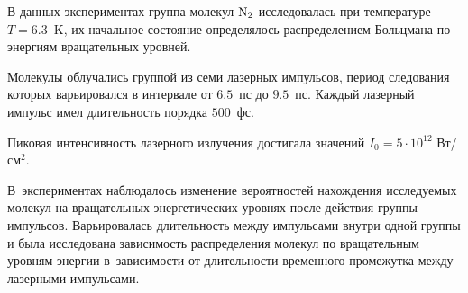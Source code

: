 В данных экспериментах группа молекул $\rm N_{2}$ исследовалась при температуре $T=6.3$~K, их начальное состояние определялось распределением Больцмана по энергиям вращательных уровней. 

Молекулы облучались группой из семи лазерных импульсов, период следования которых варьировался в интервале от $6.5$~пс до $9.5$~пс. Каждый лазерный импульс имел длительность порядка $500$~фс. 

Пиковая интенсивность лазерного излучения достигала значений $I_0=5\cdot 10^{12}$ Вт/см$^2$. 

В~экспериментах наблюдалось изменение вероятностей нахождения исследуемых молекул на вращательных энергетических уровнях после действия группы импульсов. Варьировалась длительность между импульсами внутри одной группы и была исследована зависимость распределения молекул по вращательным уровням энергии в~зависимости от длительности временного промежутка между лазерными импульсами.



